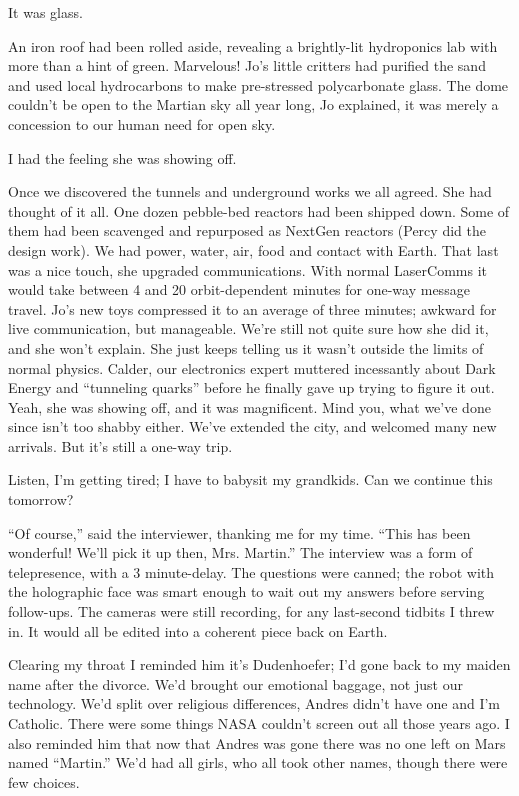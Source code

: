 \documentclass[11pt,a4paper]{article}
\newcommand{\storybreak}{%
  \par\vspace{0.6\baselineskip}
  \begin{center}\color{storyblue}\small *\enspace *\enspace *\end{center}
  \vspace{0.3\baselineskip}\noindent\ignorespaces
}
\begin{document}
It was glass.

An iron roof had been rolled aside, revealing a brightly-lit hydroponics lab with more than a hint of green. Marvelous! Jo’s little critters had purified the sand and used local hydrocarbons to make pre-stressed polycarbonate glass. The dome couldn’t be open to the Martian sky all year long, Jo explained, it was merely a concession to our human need for open sky.

I had the feeling she was showing off.

Once we discovered the tunnels and underground works we all agreed. She had thought of it all. One dozen pebble-bed reactors had been shipped down. Some of them had been scavenged and repurposed as NextGen reactors (Percy did the design work). We had power, water, air, food and contact with Earth. That last was a nice touch, she upgraded communications. With normal LaserComms it would take between 4 and 20 orbit-dependent minutes for one-way message travel. Jo’s new toys compressed it to an average of three minutes; awkward for live communication, but manageable. We’re still not quite sure how she did it, and she won’t explain. She just keeps telling us it wasn’t outside the limits of normal physics. Calder, our electronics expert muttered incessantly about Dark Energy and “tunneling quarks” before he finally gave up trying to figure it out. Yeah, she was showing off, and it was magnificent. Mind you, what we’ve done since isn’t too shabby either. We’ve extended the city, and welcomed many new arrivals. But it’s still a one-way trip.

\storybreak

Listen, I’m getting tired; I have to babysit my grandkids. Can we continue this tomorrow?

“Of course,” said the interviewer, thanking me for my time. “This has been wonderful! We’ll pick it up then, Mrs. Martin.” The interview was a form of telepresence, with a 3 minute-delay. The questions were canned; the robot with the holographic face was smart enough to wait out my answers before serving follow-ups. The cameras were still recording, for any last-second tidbits I threw in. It would all be edited into a coherent piece back on Earth.

\storybreak

Clearing my throat I reminded him it’s Dudenhoefer; I’d gone back to my maiden name after the divorce. We’d brought our emotional baggage, not just our technology. We’d split over religious differences, Andres didn’t have one and I’m Catholic. There were some things NASA couldn’t screen out all those years ago. I also reminded him that now that Andres was gone there was no one left on Mars named “Martin.” We’d had all girls, who all took other names, though there were few choices.
\end{document}
